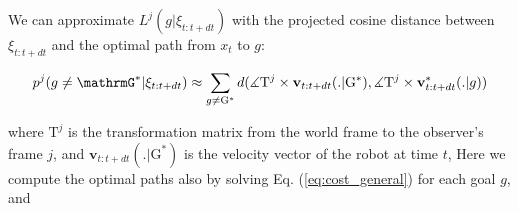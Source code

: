 We can approximate $L^j(g | \xi_{t:t+dt})$ with the projected cosine distance between $\xi_{t:t+dt}$ and the optimal path from $x_t$ to $g$:

\begin{equation}
    \label{eq:prob_leg_approx}
    p^j(g \neq \mathrmG^* | \xi_{t:t+dt}) \approx \sum_{g \neq \mathrm G^*}  d (\measuredangle \mathrm T^j \times \mathbf{v}_{t:t+dt}(.|\mathrm G^*),
                                                                 \measuredangle \mathrm T^j \times \mathbf{v}^*_{t:t+dt}(.|g))
\end{equation}

\noindent
where $\mathrm T^j$ is the transformation matrix from the world frame to the observer's frame $j$,
and $\mathbf{v}_{t:t+dt}(.|\mathrm G^*)$ is the velocity vector of the robot at time $t$,
Here we compute the optimal paths also by solving Eq. (\ref{eq:cost_general}) for each goal $g$, and

